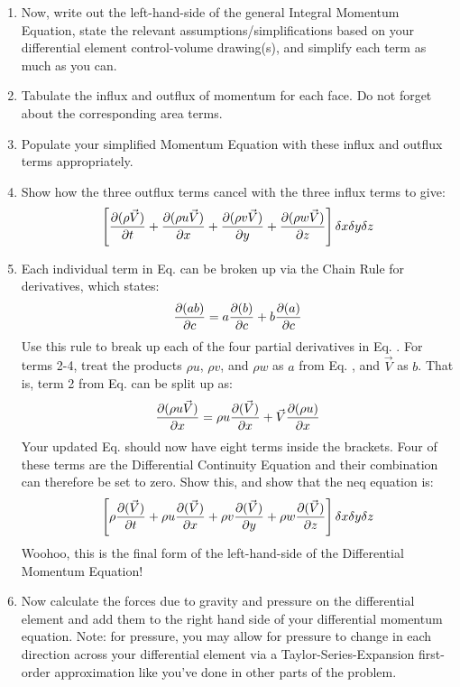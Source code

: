 \documentclass[../main.tex]{subfiles}
\begin{document}
\begin{enumerate}[label = (\alph*)]
\begin{enumerate}[label = (b\arabic*)]
        \item
            Now, write out the left-hand-side of the general Integral Momentum Equation, state the relevant assumptions/simplifications based on your differential element control-volume drawing(s), and simplify each term as much as you can.

        \item
            Tabulate the influx and outflux of momentum for each face.
            Do not forget about the corresponding area terms.

        \item
            Populate your simplified Momentum Equation with these influx and outflux terms appropriately.

        \item
            Show how the three outflux terms cancel with the three influx terms to give:
            \[
                \left[{
                    \pdv{(\rho \vec{V})}{t} + \pdv{(\rho u \vec{V})}{x} + \pdv{(\rho v \vec{V})}{y} + \pdv{(\rho w \vec{V})}{z}
                }\right]
                \delta x \delta y \delta z
            \]
        
        \item
            Each individual term in Eq. can be broken up via the Chain Rule for derivatives, which states:
            \[
                \pdv{(ab)}{c} = a\pdv{(b)}{c} + b\pdv{(a)}{c}  
            \]
            Use this rule to break up each of the four partial derivatives in Eq. .
            For terms 2-4, treat the products $\rho u$, $\rho v$, and $\rho w$ as $a$ from Eq. , and $\vec{V}$ as $b$.
            That is, term 2 from Eq. can be split up as:
            \[
                \pdv{(\rho u \vec{V})}{x} = \rho u \pdv{(\vec{V})}{x} + \vec{V}\pdv{(\rho u)}{x}   
            \]
            Your updated Eq. should now have eight terms inside the brackets.
            Four of these terms are the Differential Continuity Equation and their combination can therefore be set to zero.
            Show this, and show that the neq equation is:
            \[
                \left[{
                    \rho\pdv{(\vec{V})}{t} + \rho u\pdv{(\vec{V})}{x} + \rho v\pdv{( \vec{V})}{y} + \rho w \pdv{(\vec{V})}{z}
                }\right]
                \delta x \delta y \delta z
            \]
            Woohoo, this is the final form of the left-hand-side of the Differential Momentum Equation!

        \item
            Now calculate the forces due to gravity and pressure on the differential element and add them to the right hand side of your differential momentum equation.
            Note: for pressure, you may allow for pressure to change in each direction across your differential element via a Taylor-Series-Expansion first-order approximation like you've done in other parts of the problem.
        

\end{enumerate}
\end{enumerate}
\end{document}
